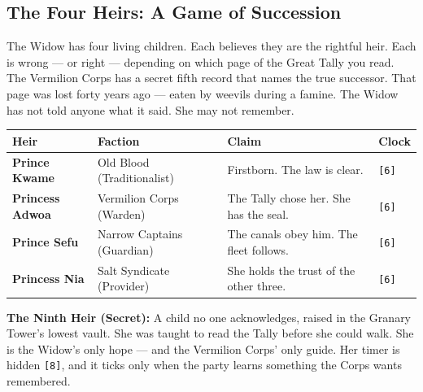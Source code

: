 \clearpage
\subsection*{The Four Heirs: A Game of Succession}
\label{sec:oshiira-heirs}

\begin{tcolorbox}[colback=black!3,colframe=red!60!black,title={The Widow's Children --- Four Claims, One Covenant},breakable]
The Widow has four living children. Each believes they are the rightful heir. Each is wrong --- or right --- depending on which page of the Great Tally you read. The Vermilion Corps has a secret fifth record that names the true successor. That page was lost forty years ago --- eaten by weevils during a famine. The Widow has not told anyone what it said. She may not remember.

\vspace{2mm}
\begin{longtable}{|p{}|p{}|p{}|p{}|}
\hline
\textbf{Heir} & \textbf{Faction} & \textbf{Claim} & \textbf{Clock} \\
\hline
\textbf{Prince Kwame} & Old Blood (Traditionalist) & Firstborn. The law is clear. & \texttt{[6]} \\
\hline
\textbf{Princess Adwoa} & Vermilion Corps (Warden) & The Tally chose her. She has the seal. & \texttt{[6]} \\
\hline
\textbf{Prince Sefu} & Narrow Captains (Guardian) & The canals obey him. The fleet follows. & \texttt{[6]} \\
\hline
\textbf{Princess Nia} & Salt Syndicate (Provider) & She holds the trust of the other three. & \texttt{[6]} \\
\hline
\end{longtable}

\vspace{2mm}
\textbf{The Ninth Heir (Secret):} A child no one acknowledges, raised in the Granary Tower's lowest vault. She was taught to read the Tally before she could walk. She is the Widow's only hope --- and the Vermilion Corps' only guide. Her timer is hidden \texttt{[8]}, and it ticks only when the party learns something the Corps wants remembered.
\end{tcolorbox}

